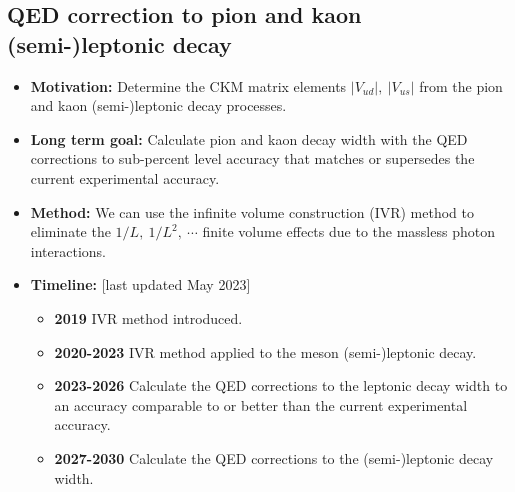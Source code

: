 \documentclass[12pt,hyperpdf]{article}
\begin{document}
\subsection{QED correction to pion and kaon (semi-)leptonic decay}
\begin{itemize}
    \item{\bf Motivation:} Determine the CKM matrix elements $|V_{ud}|,~|V_{us}|$ from the pion and kaon (semi-)leptonic decay processes.
    \item{\bf Long term goal:} Calculate pion and kaon decay width with the QED corrections to sub-percent level accuracy that matches or supersedes the current experimental accuracy.
    \item{\bf Method:}
      We can use the infinite volume construction (IVR) method \cite{Christ:2023lcc} to eliminate
      the $1/L,~1/L^2,~\cdots$ finite volume effects due to the massless photon interactions.
\item{\bf Timeline:} \hfill [last updated May 2023]
\begin{itemize}
    \item{\bf 2019} IVR method introduced.
    \item{\bf 2020-2023} IVR method applied to the meson (semi-)leptonic decay.
    \item{\bf 2023-2026} Calculate the QED corrections to the leptonic decay width to an accuracy comparable to or better than the current experimental accuracy.
    \item{\bf 2027-2030} Calculate the QED corrections to the (semi-)leptonic decay width.
\end{itemize}
\end{itemize}


\end{document}
